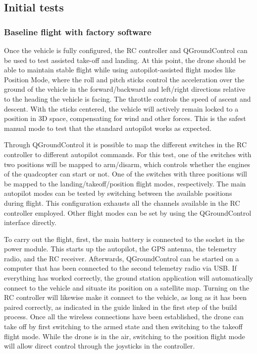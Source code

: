 \subsection{Initial tests}
\label{sec:test-8-flight}


\subsubsection{Baseline flight with factory software}
\label{subsec:fl-test-1}

Once the vehicle is fully configured, the RC controller and QGroundControl can be used to test assisted take-off and landing.
At this point, the drone should be able to maintain stable flight while using autopilot-assisted flight modes like Position Mode, where the roll and pitch sticks control the acceleration over the ground of the vehicle in the forward/backward and left/right directions relative to the heading the vehicle is facing.
The throttle controls the speed of ascent and descent. 
With the sticks centered, the vehicle will actively remain locked to a position in 3D space, compensating for wind and other forces.
This is the safest manual mode to test that the standard autopilot works as expected.

Through QGroundControl it is possible to map the different switches in the RC controller to different autopilot commands.
For this test, one of the switches with two positions will be mapped to arm/disarm, which controls whether the engines of the quadcopter can start or not. One of the switches with three positions will be mapped to the landing/takeoff/position flight modes, respectively. The main autopilot modes can be tested by switching between the available positions during flight.
This configuration exhausts all the channels available in the RC controller employed.
Other flight modes can be set by using the QGroundControl interface directly.

To carry out the flight, first, the main battery is connected to the socket in the power module.
This starts up the autopilot, the GPS antenna, the telemetry radio, and the RC receiver.
Afterwards, QGroundControl can be started on a computer that has been connected to the second telemetry radio via USB.
If everything has worked correctly, the ground station application will automatically connect to the vehicle and situate its position on a satellite map.
Turning on the RC controller will likewise make it connect to the vehicle, as long as it has been paired correctly, as indicated in the guide linked in the first step of the build process.
Once all the wireless connections have been established, the drone can take off by first switching to the armed state and then switching to the takeoff flight mode.
While the drone is in the air, switching to the position flight mode will allow direct control through the joysticks in the controller.


